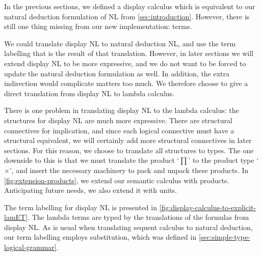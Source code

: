 In the previous sections, we defined a display calculus which is
equivalent to our natural deduction formulation of NL from
\autoref{sec:introduction}. However, there is still one thing missing
from our new implementation: terms.

We could translate display NL to natural deduction NL, and use the
term labelling that is the result of that translation. However, in
later sections we will extend display NL to be more expressive, and we
do not want to be forced to update the natural deduction formulation
as well. In addition, the extra indirection would complicate matters
too much. We therefore choose to give a direct translation from
display NL to lambda calculus.



There is one problem in translating display NL to the lambda
calculus: the structures for display NL are much more expressive. There
are structural connectives for implication, and since each logical
connective must have a structural equivalent, we will certainly add
more structural connectives in later sections. For this reason, we
choose to translate all structures to types. The one downside to this
is that we must translate the product `$\prod$' to the product type
`$\times$', and insert the necessary machinery to pack and unpack
these products.
In \autoref{fig:extension-products}, we extend our semantic calculus
with products. Anticipating future needs, we also extend it with
units.



The term labelling for display NL is presented in
\autoref{fig:display-calculus-to-explicit-lamET}. The lambda terms are
typed by the translations of the  formulas from display NL. As is
usual when translating sequent calculus to natural deduction, our term
labelling employs substitution, which was defined in
\autoref{sec:simple-type-logical-grammar}.

\vspace*{1\baselineskip}

